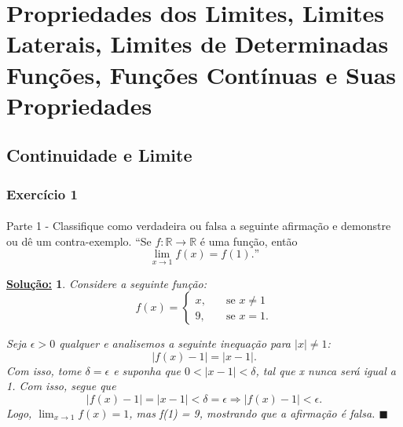 \documentclass{article}
\newtheorem*{sol*}{\underline{Solu\c c\~ao:}}
\renewcommand\qedsymbol{$\blacksquare$}
\begin{document}
\section{Propriedades dos Limites, Limites Laterais, Limites de Determinadas Fun\c c\~oes, Fun\c c\~oes Cont\'inuas e Suas Propriedades}
\subsection{Continuidade e Limite}
\subsubsection{Exerc\'icio 1}
\paragraph{} Parte 1 - Classifique como verdadeira ou falsa a seguinte afirma\c c\~ao e demonstre ou d\^e um contra-exemplo.
``Se $f: \mathbb{R}\rightarrow\mathbb{R}$ \'e uma fun\c c\~ao, ent\~ao
$$
	\lim_{x\to{1}}f(x) = f(1).\text{''}
$$
\begin{sol*}
	Considere a seguinte fun\c c\~ao:
	$$
		f(x) = \left\{
		\begin{array}{ll}
			x, & \quad \text{se } x\neq{1} \\
			9, & \quad \text{se } x=1.
		\end{array}
		\right.
	$$

	Seja $\epsilon > 0$ qualquer e analisemos a seguinte inequa\c c\~ao para $|x|\neq 1$:
	$$
		|f(x) - 1| = |x - 1|.
	$$
	Com isso, tome $\delta = \epsilon$ e suponha que $0 < |x - 1| < \delta$, tal que x nunca ser\'a igual a 1. Com isso, segue que
	$$
		|f(x) - 1| = |x - 1| < \delta = \epsilon \Rightarrow |f(x) - 1| < \epsilon.
	$$
	Logo, $\lim_{x\to{1}}f(x) = 1$, mas f(1) = 9, mostrando que a afirma\c c\~ao \'e falsa.
	\qedsymbol
\end{sol*}
\end{document}
